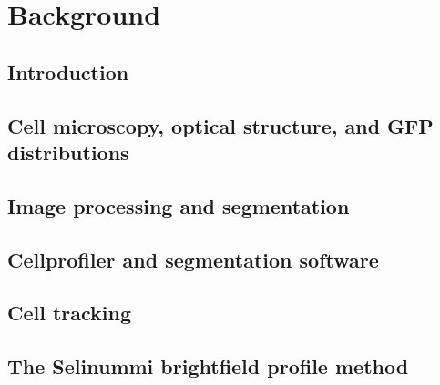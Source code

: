 
\chapter{Background}

\ifpdf
    \graphicspath{{Chapter3/Figs/Raster/}{Chapter3/Figs/PDF/}{Chapter3/Figs/}}
\else
    \graphicspath{{Chapter3/Figs/Vector/}{Chapter3/Figs/}}
\fi

\section{Introduction}
\section{Cell microscopy, optical structure, and GFP distributions}
\section{Image processing and segmentation}
\section{Cellprofiler and segmentation software}
\section{Cell tracking}
\section{The Selinummi brightfield profile method}
